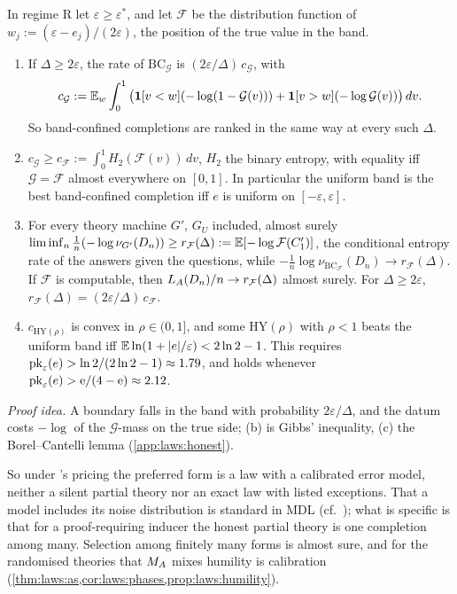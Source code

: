 \begin{proposition}\label{prop:laws:errormodel}
In regime R let $\varepsilon\ge\varepsilon^*$, and let $\mathcal F$ be the distribution function of $w_j:=(\varepsilon-e_j)/(2\varepsilon)$, the position of the true value in the band.
\begin{enumerate}[label=(\alph*),itemsep=1pt,topsep=2pt]
\item If $\Delta\ge2\varepsilon$, the rate of $\mathrm{BC}_{\mathcal G}$ is $(2\varepsilon/\Delta)\,c_{\mathcal G}$, with
\[c_{\mathcal G}:=\mathbb{E}_w\int_0^1\big(\mathbf{1}[v<w](-\log(1-\mathcal G(v)))+\mathbf{1}[v>w](-\log\mathcal G(v))\big)\,dv.\]
So band-confined completions are ranked in the same way at every such $\Delta$.
\item $c_{\mathcal G}\ge c_{\mathcal F}:=\int_0^1H_2(\mathcal F(v))\,dv$, $H_2$ the binary entropy, with equality iff $\mathcal G=\mathcal F$ almost everywhere on $[0,1]$. In particular the uniform band is the best band-confined completion iff $e$ is uniform on $[-\varepsilon,\varepsilon]$.
\item For every theory machine $G'$, $G_U$ included, almost surely $\liminf_n\frac1n(-\log\nu_{G'}(D_n))\ge r_{\mathcal F}(\Delta):=\mathbb{E}[-\log\mathcal F(C'_1)]$, the conditional entropy rate of the answers given the questions, while $-\frac1n\log\nu_{\mathrm{BC}_{\mathcal F}}(D_n)\to r_{\mathcal F}(\Delta)$. If $\mathcal F$ is computable, then $L_{A}(D_n)/n\to r_{\mathcal F}(\Delta)$ almost surely. For $\Delta\ge2\varepsilon$, $r_{\mathcal F}(\Delta)=(2\varepsilon/\Delta)\,c_{\mathcal F}$.
\item $c_{\mathrm{HY}(\rho)}$ is convex in $\rho\in(0,1]$, and some $\mathrm{HY}(\rho)$ with $\rho<1$ beats the uniform band iff $\mathbb{E}\ln(1+\lvert e\rvert/\varepsilon)<2\ln2-1$. This requires $\mathrm{pk}_\varepsilon(e)>\ln2/(2\ln2-1)\approx1.79$, and holds whenever $\mathrm{pk}_\varepsilon(e)>\mathrm e/(4-\mathrm e)\approx2.12$.
\end{enumerate}
\end{proposition}

\emph{Proof idea.} A boundary falls in the band with probability $2\varepsilon/\Delta$, and the datum costs $-\log$ of the $\mathcal G$-mass on the true side; (b) is Gibbs' inequality, (c) the Borel--Cantelli lemma (\cref{app:laws:honest}).

So under \SAIabbr's pricing the preferred form is a law with a calibrated error model, neither a silent partial theory nor an exact law with listed exceptions. That a model includes its noise distribution is standard in MDL (cf.\ \citealp{rissanen1978modeling,grunwald2007minimum}); what is specific is that for a proof-requiring inducer the honest partial theory is one completion among many. Selection among finitely many forms is almost sure, and for the randomised theories that $M_{A}$ mixes humility is calibration (\cref{thm:laws:as,cor:laws:phases,prop:laws:humility}).

